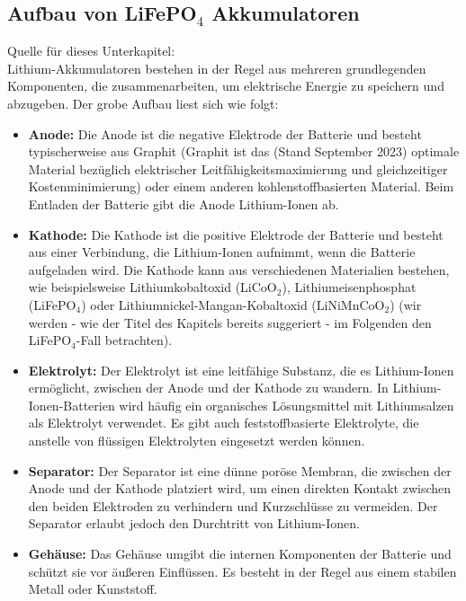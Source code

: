 \subsection[Aufbau von LiFePO4 Akkumulatoren]{Aufbau von LiFePO\(_4\) Akkumulatoren}{\label{subsec:strucbatt}}
Quelle für dieses Unterkapitel: \cite{LiAkkuSkillLync} \\
Lithium-Akkumulatoren bestehen in der Regel aus mehreren grundlegenden Komponenten, die zusammenarbeiten, um elektrische Energie zu speichern und abzugeben. Der grobe Aufbau liest sich wie folgt:
\begin{itemize}
    \item \textbf{Anode:} Die Anode ist die negative Elektrode der Batterie und besteht typischerweise aus Graphit (Graphit ist das (Stand September 2023) optimale Material bezüglich elektrischer Leitfähigkeitsmaximierung und gleichzeitiger Kostenminimierung) oder einem anderen kohlenstoffbasierten Material. Beim Entladen der Batterie gibt die Anode Lithium-Ionen ab.
    
    \item \textbf{Kathode:} Die Kathode ist die positive Elektrode der Batterie und besteht aus einer Verbindung, die Lithium-Ionen aufnimmt, wenn die Batterie aufgeladen wird. Die Kathode kann aus verschiedenen Materialien bestehen, wie beispielsweise Lithiumkobaltoxid (LiCoO\(_2\)), Lithiumeisenphosphat (LiFePO\(_4\)) oder Lithiumnickel-Mangan-Kobaltoxid (LiNiMnCoO\(_2\)) (wir werden - wie der Titel des Kapitels bereits suggeriert - im Folgenden den LiFePO\(_4\)-Fall betrachten).

    \item \textbf{Elektrolyt:} Der Elektrolyt ist eine leitfähige Substanz, die es Lithium-Ionen ermöglicht, zwischen der Anode und der Kathode zu wandern. In Lithium-Ionen-Batterien wird häufig ein organisches Lösungsmittel mit Lithiumsalzen als Elektrolyt verwendet. Es gibt auch feststoffbasierte Elektrolyte, die anstelle von flüssigen Elektrolyten eingesetzt werden können.

    \item \textbf{Separator:} Der Separator ist eine dünne poröse Membran, die zwischen der Anode und der Kathode platziert wird, um einen direkten Kontakt zwischen den beiden Elektroden zu verhindern und Kurzschlüsse zu vermeiden. Der Separator erlaubt jedoch den Durchtritt von Lithium-Ionen.

    \item \textbf{Gehäuse:} Das Gehäuse umgibt die internen Komponenten der Batterie und schützt sie vor äußeren Einflüssen. Es besteht in der Regel aus einem stabilen Metall oder Kunststoff.
\end{itemize}

